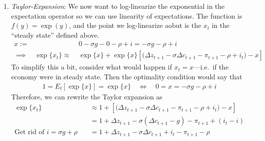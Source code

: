\documentclass[12pt]{article}
\theoremstyle{plain}
\theoremstyle{definition}
\theoremstyle{remark}
\begin{document}
\begin{itemize}
\begin{enumerate}[label=(\roman*)]
      \item \emph{Taylor-Expansion}:
        We now want to log-linearize the exponential in the expectation
        operator so we can use linearity of expectations. The function is
        $f(y)=\exp(y)$, and the point we log-linearize aobut is the $x_t$ in
        the ``steady state'' defined above.
        \begin{align*}
          x :=&\; 0 - \sigma g - 0 - \rho + i
          = -\sigma g-\rho + i\\
          \implies\quad
          \exp\{x_t\}
          \approx&\;
          \exp\{x\} +
          \exp\{x\}
          \left[
            \big(
            \Delta z_{t+1}
            -\sigma \Delta c_{t+1}
            - \pi_{t+1}
            -\rho
            + i_t
            \big)
            - x
          \right]
        \end{align*}
        To simplify this a bit, consider what would happen if
        $x_t=x$---i.e.\ if the economy were in steady state. Then the
        optimality condition would say that
        \begin{align*}
          1 = E_t[\exp\{x\}] = \exp\{x\}
          \quad\iff\quad
          0 = x = -\sigma g -\rho +i
        \end{align*}
        Therefore, we can rewrite the Taylor expansion as
        \begin{align*}
          \exp\{x_t\}
          &\approx
          1 +
          \left[
            \big(
            \Delta z_{t+1}
            -\sigma \Delta c_{t+1}
            - \pi_{t+1}
            -\rho
            + i_t
            \big)
            - x
          \right] \\
          &=
          1 +
            \Delta z_{t+1}
            -\sigma (\Delta c_{t+1}-g)
            - \pi_{t+1}
            + (i_t -i) \\
          \text{Get rid of $i=\sigma g+\rho$}\quad
          &=
          1 +
            \Delta z_{t+1}
            -\sigma \Delta c_{t+1}
            + i_t
            - \pi_{t+1} -\rho
        \end{align*}


\end{enumerate}
\end{itemize}
\end{document}
